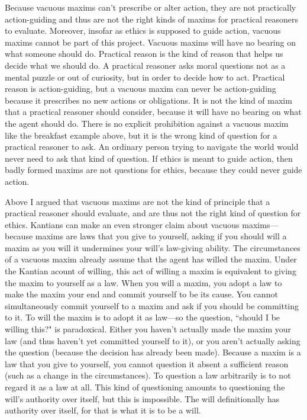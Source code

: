 \begin{isabellebody}
\begin{isamarkuptext}
Because vacuous maxims can't prescribe or alter action, they are not practically action-guiding and 
thus are not the right kinds of maxims for practical reasoners to evaluate. Moreover, insofar as ethics 
is supposed to guide action, vacuous maxims cannot be part of this project. Vacuous maxims
will have no bearing on what someone should do. Practical reason
is the kind of reason that helps us decide what we should do. 
A practical reasoner asks moral questions not as a mental puzzle or out of curiosity, but 
in order to decide how to act. Practical reason is action-guiding, but a vacuous
 maxim can never be action-guiding because it prescribes no new
actions or obligations. It is not the kind of maxim that a practical reasoner should consider, because it
will have no bearing on what the agent should do. 
There is no explicit prohibition against a vacuous maxim like the breakfast example above, but it 
is the wrong kind of question for a practical reasoner to ask. An ordinary person trying 
to navigate the world would never need to ask that kind of question. If ethics is meant 
to guide action, then badly formed maxims are not questions for ethics, because they could never guide 
action.

Above I argued that vacuous maxims are not the kind of principle that a practical reasoner should 
evaluate, and are thus not the right kind of question for ethics. Kantians can make an even stronger claim
about vacuous maxims—because maxims are laws that you give to yourself, asking if you should will 
a maxim as you will it undermines your will's law-giving ability. The circumstances of a vacuous maxim 
already assume that the agent has willed the maxim. Under the Kantian acount of willing, this act 
of willing a maxim is equivalent to giving the maxim to yourself as a law. When you will a maxim, you
adopt a law to make the maxim your end and commit yourself to be its cause. You cannot simultaneously 
commit yourself to a maxim and ask if you should be committing to it. To 
will the maxim is to adopt it as law—so the question, ``should I be 
willing this?" is paradoxical. Either you haven't actually made the maxim your law (and thus haven't yet 
committed yourself to it), or you aren't actually asking the question (because the decision has already been made).
Because a maxim is a law that you give to yourself, you cannot question it absent a sufficient reason 
(such as a change in the circumstances). To question a law arbitrarily is to not regard it as a law at all.
This kind of questioning amounts to questioning the will's authority over itself, but this is 
impossible. The will definitionally has authority over itself, for that is what it is to be a 
will. 


\end{isamarkuptext}
\end{isabellebody}
